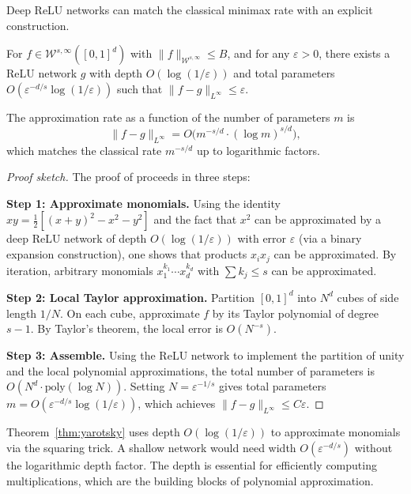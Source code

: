 \documentclass[11pt,a4paper]{article}
\begin{document}
Deep ReLU networks can match the classical minimax rate with an
explicit construction.

\begin{theorem}[Yarotsky, 2017]
\label{thm:yarotsky}
For $f \in \mathcal{W}^{s,\infty}([0,1]^d)$ with
$\|f\|_{\mathcal{W}^{s,\infty}} \le B$, and for any $\varepsilon > 0$,
there exists a ReLU network $g$ with depth $O(\log(1/\varepsilon))$
and total parameters $O(\varepsilon^{-d/s} \log(1/\varepsilon))$ such
that $\|f - g\|_{L^\infty} \le \varepsilon$.

The approximation rate as a function of the number of parameters $m$ is
\[
  \|f - g\|_{L^\infty} = O\bigl(m^{-s/d} \cdot (\log m)^{s/d}\bigr),
\]
which matches the classical rate $m^{-s/d}$ up to logarithmic factors.
\end{theorem}

\begin{proof}[Proof sketch]
The proof of \citet{yarotsky2017} proceeds in three steps:

\textbf{Step 1: Approximate monomials.}  Using the identity $xy =
\frac{1}{2}[(x+y)^2 - x^2 - y^2]$ and the fact that $x^2$ can be
approximated by a deep ReLU network of depth $O(\log(1/\varepsilon))$
with error $\varepsilon$ (via a binary expansion construction), one
shows that products $x_i x_j$ can be approximated.  By iteration,
arbitrary monomials $x_1^{k_1} \cdots x_d^{k_d}$ with $\sum k_j \le s$
can be approximated.

\textbf{Step 2: Local Taylor approximation.}  Partition $[0,1]^d$ into
$N^d$ cubes of side length $1/N$.  On each cube, approximate $f$ by its
Taylor polynomial of degree $s - 1$.  By Taylor's theorem, the local
error is $O(N^{-s})$.

\textbf{Step 3: Assemble.}  Using the ReLU network to implement the
partition of unity and the local polynomial approximations, the total
number of parameters is $O(N^d \cdot \text{poly}(\log N))$.  Setting
$N = \varepsilon^{-1/s}$ gives total parameters $m =
O(\varepsilon^{-d/s} \log(1/\varepsilon))$, which achieves
$\|f - g\|_{L^\infty} \le C \varepsilon$.
\end{proof}

\begin{remark}
\label{rem:depth-benefit-sobolev}
Theorem~\ref{thm:yarotsky} uses depth $O(\log(1/\varepsilon))$ to
approximate monomials via the squaring trick.  A shallow network
would need width $O(\varepsilon^{-d/s})$ without the logarithmic
depth factor.  The depth is essential for efficiently computing
multiplications, which are the building blocks of polynomial
approximation.
\end{remark}
\end{document}
